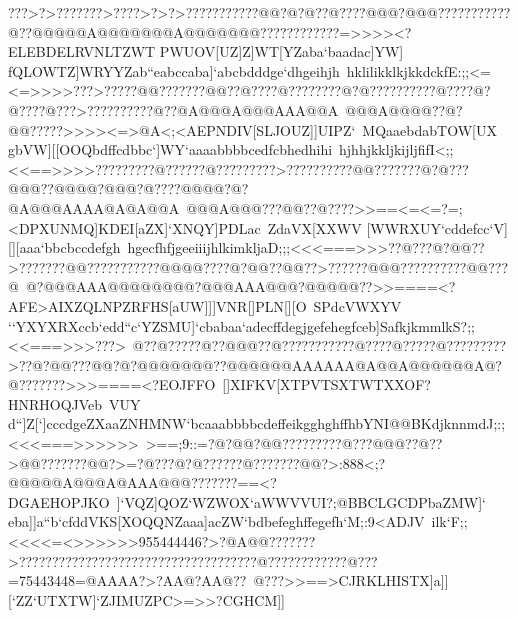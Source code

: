 {{{ ???>?>???????>????>?>?>???????????@@?@?@??@????@@@?@@@???????????@??@@@@@A@@@@@@@A@@@@@@@????????????=>>>><?ELEBDELRVNLTZWT%
 PWUOV[UZ]Z]WT[YZaba`baadac]YW]}
 \hbox{fQLOWTZ]WRYYZab``eabccaba]`abcbdddge`dhgeihjh%
 hklilikklkjkkdckfE:;;<=<=>>>>???>?????@@???????@@??@????@????????@?@??????????@????@?@????@???>??????????@??@A@@@A@@@AAA@@A%
 @@@A@@@@??@?@@?????>>>><=>@A<;<AEPNDIV[SLJOUZ]]UIPZ`%
 MQaaebdabTOW[UX}
 \hbox{gbVW][[OOQbdffcdbbc`]WY`aaaabbbbcedfcbhedhihi%
 hjhhjkkljkijljfifI<;;<<==>>>>?????????@??????@?????????>??????????@@???????@?@???@@@??@@@@?@@@?@????@@@@?@?@A@@@AAAA@A@A@@A%
 @@@A@@@???@@??@????>>==<=<=?=;<DPXUNMQ]KDEI[aZX]`XNQY]PDLac%
 ZdaVX[XXWV}
 \hbox{[WWRXUY`cddefcc`V][][aaa`bbcbccdefgh%
 hgecfhfjgeeiiijhlkimkljaD;;;<<<===>>>??@???@?@@??>???????@@???????????@@@@????@?@@??@@??>??????@@@??????????@@???@%
 @?@@@AAA@@@@@@@@?@@@AAA@@@?@@@@@??>>====<?AFE>AIXZQLNPZRFHS[aUW]]]VNR[]PLN[][O%
 SPdcVWXYV}
 \hbox{``YXYXRXccb`edd``c`YZSMU]`cbabaa`adecffdegjgefehegfceb]SafkjkmmlkS?;;<<===>>>???>%
 @??@?????@??@@@??@???????????@????@?????@?????????>??@?@@???@@?@?@@@@@@@??@@@@@@AAAAAA@A@@A@@@@@@A@?@???????>>>====<?EOJFFO%
 []XIFKV[XTPVTSXTWTXXOF?HNRHOQJVeb%
 VUY}
 \hbox{d``]Z[`]cccdgeZXaaZNHMNW`bcaaabbbbcdeffeikgghghffhbYNI@@BKdjknnmdJ;:;<<<===>>>>>>%
 >==;9::=?@?@@?@@?????????@???@@@??@??>@@???????@@?>=?@???@?@??????@???????@@?>:888<;?@@@@@A@@@A@AAA@@@???????==<?DGAEHOPJKO%
 ]`VQZ]QOZ`WZWOX`aWWVVUI?;@BBCLGCDPbaZMW]`}
 \hbox{eba]]a``b`cfddVKS[XOQQNZaaa]acZW`bdbefeghffegefh`M;:9<ADJV%
 ilk`F;;<<<<=<>>>>>>955444446?>?@A@@???????>????????????????????????????????????@????????????@???=75443448=@AAAA?>?AA@?AA@??%
 @???>>==>CJRKLHISTX]a]][`ZZ`UTXTW]`ZJIMUZPC>=>>?CGHCM]]%
}}}
